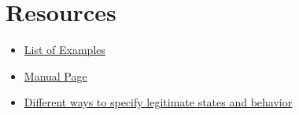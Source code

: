 
\section{Resources}
\begin{itemize}
\item \href{examplelist.html}{List of Examples}
\item \href{man.html}{Manual Page}
\item \href{legit.html}{Different ways to specify legitimate states and behavior}
\end{itemize}





